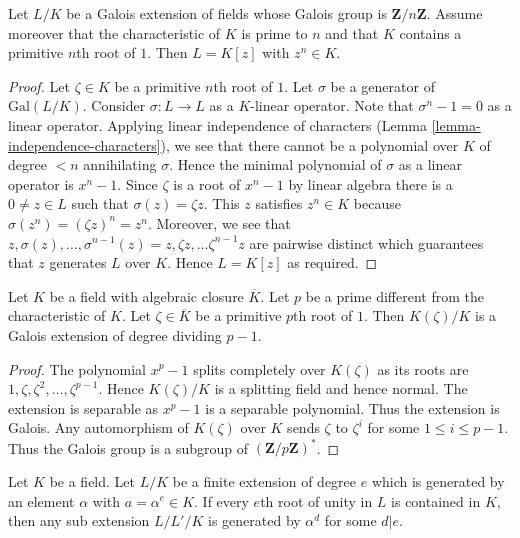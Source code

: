 \begin{lemma}
\label{lemma-Kummer}
Let $L/K$ be a Galois extension of fields whose Galois group is
$\mathbf{Z}/n\mathbf{Z}$. Assume moreover that the characteristic of $K$
is prime to $n$ and that $K$ contains a primitive $n$th root of $1$.
Then $L = K[z]$ with $z^n \in K$.
\end{lemma}

\begin{proof}
Let $\zeta \in K$ be a primitive $n$th root of $1$.
Let $\sigma$ be a generator of $\text{Gal}(L/K)$.
Consider $\sigma : L \to L$ as a $K$-linear operator.
Note that $\sigma^n - 1 = 0$ as a linear operator.
Applying linear independence of characters
(Lemma \ref{lemma-independence-characters}), we see
that there cannot be a polynomial over $K$ of degree $< n$
annihilating $\sigma$. Hence the minimal polynomial of $\sigma$
as a linear operator is $x^n - 1$. 
Since $\zeta$ is a root of $x^n - 1$ by linear algebra
there is a $0 \neq z \in L$ such that $\sigma(z) = \zeta z$.
This $z$ satisfies $z^n \in K$ because
$\sigma(z^n) = (\zeta z)^n = z^n$. Moreover, we see that
$z, \sigma(z), \ldots, \sigma^{n - 1}(z) =
z, \zeta z, \ldots \zeta^{n - 1} z$ are pairwise distinct
which guarantees that $z$ generates $L$ over $K$.
Hence $L = K[z]$ as required.
\end{proof}

\begin{lemma}
\label{lemma-adjoint-pth-root-unity}
Let $K$ be a field with algebraic closure $\overline{K}$.
Let $p$ be a prime different from the characteristic of $K$.
Let $\zeta \in \overline{K}$ be a primitive $p$th root
of $1$. Then $K(\zeta)/K$ is a Galois extension of degree dividing $p - 1$.
\end{lemma}

\begin{proof}
The polynomial $x^p - 1$ splits completely over
$K(\zeta)$ as its roots are $1, \zeta, \zeta^2, \ldots, \zeta^{p - 1}$.
Hence $K(\zeta)/K$ is a splitting field and hence normal.
The extension is separable as $x^p - 1$ is a separable polynomial.
Thus the extension is Galois. Any automorphism of $K(\zeta)$ over $K$
sends $\zeta$ to $\zeta^i$ for some $1 \leq i \leq p - 1$.
Thus the Galois group is a subgroup of $(\mathbf{Z}/p\mathbf{Z})^*$.
\end{proof}

\begin{lemma}
\label{lemma-subfields-kummer}
\begin{reference}
\cite[Theorem 5.2]{Radical}
\end{reference}
Let $K$ be a field. Let $L/K$ be a finite extension of degree $e$
which is generated by an element $\alpha$ with $a = \alpha^e \in K$.
If every $e$th root of unity in $L$ is contained in $K$, then 
any sub extension $L/L'/K$ is generated by $\alpha^d$ for some $d | e$.
\end{lemma}

